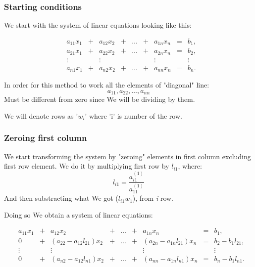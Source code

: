 \documentclass{report}
\begin{document}
\subsubsection{Starting conditions}
We start with the system of linear equations looking like this:

\[
\begin{matrix}

&a_{11}x_1 &{}+&a_{12}x_2&+&\dots&+&a_{1n}x_n &=&b_1,\\

&a_{21}x_1 &{}+&a_{22}x_2&+&\dots&+&a_{2n}x_n &=&b_2,\\

&\vdots    &&\vdots      & &     & &  \vdots  & &\vdots\\

&a_{n1}x_1&{}+&a_{n2}x_2&+&\dots &+&a_{nn}x_n&=&b_n.

\end{matrix}
\]

In order for this method to work all the elements of "diagonal" line:
\[ a_{11}, a_{22}, \dots, a_{nn} \]
Must be different from zero since We will be dividing by them.

We will denote rows as '$w_i$' where 'i' is number of the row.

\subsubsection{Zeroing first column}
We start transforming the system by "zeroing" elements in first column excluding first row element. We do it by multiplying first row by $l_{i1}$, where:
\[ l_{i1} = \frac{ a_{i1}^{(1)} }
{ a_{11}^{(1)} }  \]
And then substracting what We got ($ l_{i1}w_1 $), from \textit{i} row.

Doing so We obtain a system of linear equations:

\[
\begin{matrix}

&a_{11}x_1 &{}+&a_{12}x_2&+&\dots&+&a_{1n}x_n &=&b_1,\\

&0 &{}+&(a_{22} - a_{12}l_{21})x_2&{}+&\dots&{}+&(a_{2n} - a_{1n}l_{21})x_n &=&b_2 - b_{1}l_{21},\\

&\vdots    &&\vdots      & &     & &  \vdots  & &\vdots\\

&0&{}+&(a_{n2} - a_{12}l_{n1})x_2&+&\dots &+&(a_{nn} - a_{1n}l_{n1})x_n&=&b_n - b_{1}l_{n1}.

\end{matrix}
\]
\end{document}
